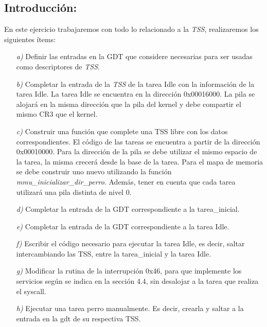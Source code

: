 \subsection{Introducción:}

En este ejercicio trabajaremos con todo lo relacionado a la \textit{TSS}, realizaremos los siguientes ítems:

\begin{itemize}



\item [\textit{a)}]  Definir las entradas en la GDT que considere necesarias para ser usadas como descriptores de \textit{TSS}.

\item [\textit{b)}] Completar la entrada de la \textit{TSS} de la tarea Idle con la información de la tarea Idle. La tarea Idle se encuentra en la dirección 0x00016000. La pila se alojará en la misma dirección que la pila del kernel y debe compartir el mismo CR3 que el kernel.

\item [\textit{c)}]  Construir una función que complete una TSS libre con los datos correspondientes. El código de las tareas se encuentra a partir de la dirección 0x00010000. Para la dirección de la pila se debe utilizar el mismo espacio de la tarea, la misma crecerá desde la base de la tarea. Para el mapa de memoria se debe construir uno nuevo utilizando la función \textit{mmu\_inicializar\_dir\_perro}. Además, tener en cuenta que cada tarea utilizará una pila distinta de nivel 0. 

\item [\textit{d)}] Completar la entrada de la GDT correspondiente a la tarea\_inicial.

\item [\textit{e)}]  Completar la entrada de la GDT correspondiente a la tarea Idle.

\item [\textit{f)}]  Escribir el código necesario para ejecutar la tarea Idle, es decir, saltar intercambiando las TSS, entre la tarea\_inicial y la tarea Idle.

\item [\textit{g)}] Modificar la rutina de la interrupción 0x46, para que implemente los servicios según se indica en la sección 4.4, sin desalojar a la tarea que realiza el syscall.

\item [\textit{h)}]  Ejecutar una tarea perro manualmente. Es decir, crearla y saltar a la entrada en la gdt de su respectiva TSS.

\end{itemize}

